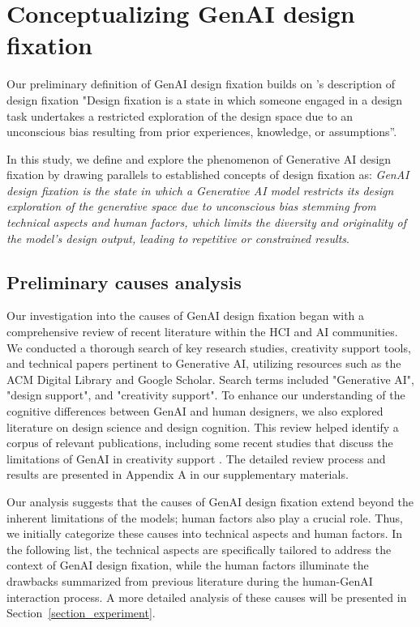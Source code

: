 \section{Conceptualizing GenAI design fixation}
\label{section_definition}
Our preliminary definition of GenAI design fixation builds on \cite{crilly2017next}'s description of design fixation "Design fixation is a state in which someone engaged in a design task undertakes a restricted exploration of the design space due to an unconscious bias resulting from prior experiences, knowledge, or assumptions”. 


In this study, we define and explore the phenomenon of Generative AI design fixation by drawing parallels to established
concepts of design fixation as: \textit{GenAI design fixation is the state in which a Generative AI model restricts its design exploration of the generative space due to unconscious bias stemming from technical aspects and human factors, which limits the diversity and originality of the model's design output, leading to repetitive or constrained results}.

\subsection{Preliminary causes analysis}

Our investigation into the causes of GenAI design fixation began with a comprehensive review of recent literature within the HCI and AI communities. We conducted a thorough search of key research studies, creativity support tools, and technical papers pertinent to Generative AI, utilizing resources such as the ACM Digital Library and Google Scholar. Search terms included "Generative AI", "design support", and "creativity support". To enhance our understanding of the cognitive differences between GenAI and human designers, we also explored literature on design science and design cognition. This review helped identify a corpus of relevant publications, including some recent studies that discuss the limitations of GenAI in creativity support \cite{doshi2024generative, kobiella2024if, anderson2024evaluating}. The detailed review process and results are presented in Appendix A in our supplementary materials.

Our analysis suggests that the causes of GenAI design fixation extend beyond the inherent limitations of the models; human factors also play a crucial role. Thus, we initially categorize these causes into technical aspects and human factors. In the following list, the technical aspects are specifically tailored to address the context of GenAI design fixation, while the human factors illuminate the drawbacks summarized from previous literature during the human-GenAI interaction process. A more detailed analysis of these causes will be presented in Section~\ref{section_experiment}.

